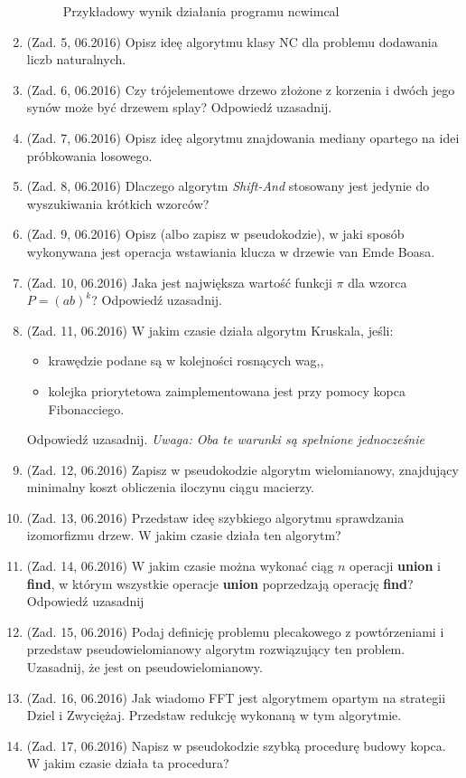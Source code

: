 \documentclass[10pt]{article}%
\begin{document}
\begin{enumerate}
\begin{figure}[H]
\caption{Przykładowy wynik działania programu ncwimcal}
\end{figure} 
\item (Zad. 5, 06.2016) Opisz ideę algorytmu klasy NC dla problemu dodawania liczb naturalnych.
\item (Zad. 6, 06.2016) Czy trójelementowe drzewo złożone z korzenia i dwóch jego synów może być drzewem splay? Odpowiedź uzasadnij.
\item (Zad. 7, 06.2016) Opisz ideę algorytmu znajdowania mediany opartego na idei próbkowania losowego.
\item (Zad. 8, 06.2016) Dlaczego algorytm \textit{Shift-And} stosowany jest jedynie do wyszukiwania krótkich wzorców?
\item (Zad. 9, 06.2016) Opisz (albo zapisz w pseudokodzie), w jaki sposób wykonywana jest operacja wstawiania klucza w drzewie van Emde Boasa.
\item (Zad. 10, 06.2016) Jaka jest największa wartość funkcji $\pi$ dla wzorca $ P = (ab)^k$? Odpowiedź uzasadnij.
\item (Zad. 11, 06.2016) W jakim czasie działa algorytm Kruskala, jeśli:
\begin{itemize}
\item krawędzie podane są w kolejności rosnących wag,,
\item kolejka priorytetowa zaimplementowana jest przy pomocy kopca Fibonacciego.
\end{itemize}
Odpowiedź uzasadnij. \textit{Uwaga: Oba te warunki są spełnione jednocześnie}
\item (Zad. 12, 06.2016) Zapisz w pseudokodzie algorytm wielomianowy, znajdujący minimalny koszt obliczenia iloczynu ciągu macierzy.
\item (Zad. 13, 06.2016) Przedstaw ideę szybkiego algorytmu sprawdzania izomorfizmu drzew. W jakim czasie działa ten algorytm?
\item (Zad. 14, 06.2016) W jakim czasie można wykonać ciąg $n$ operacji \textbf{union} i \textbf{find}, w którym wszystkie operacje \textbf{union} poprzedzają operację \textbf{find}? Odpowiedź uzasadnij 
\item (Zad. 15, 06.2016) Podaj definicję problemu plecakowego z powtórzeniami i przedstaw pseudowielomianowy algorytm rozwiązujący ten problem. Uzasadnij, że jest on pseudowielomianowy.
\item (Zad. 16, 06.2016) Jak wiadomo FFT jest algorytmem opartym na strategii Dziel i Zwyciężaj. Przedstaw redukcję wykonaną w tym algorytmie.
\item (Zad. 17, 06.2016) Napisz w pseudokodzie szybką procedurę budowy kopca. W jakim czasie działa ta procedura?

\end{enumerate}
\end{document}
